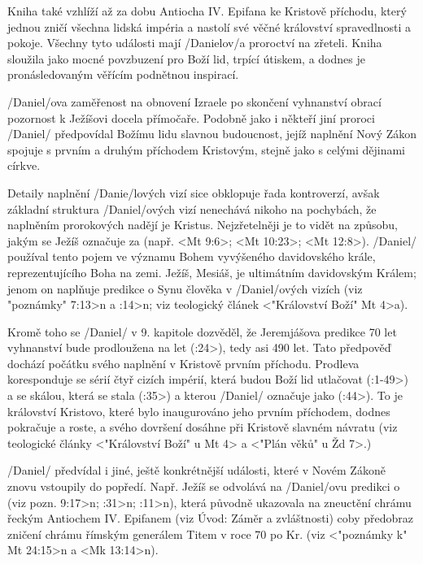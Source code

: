 Kniha také vzhlíží až za dobu Antiocha IV. Epifana ke Kristově příchodu, který jednou zničí všechna lidská impéria a nastolí své věčné království spravedlnosti a pokoje. Všechny tyto události mají \x/Danielov/a proroctví na zřeteli.
Kniha sloužila jako mocné povzbuzení pro Boží lid, trpící útiskem, a dodnes je pronásledovaným věřícím podnětnou inspirací. 


\x/Daniel/ova zaměřenost na obnovení Izraele po skončení vyhnanství obrací pozornost k Ježíšovi docela přímočaře.
Podobně jako i někteří jiní proroci \x/Daniel/ předpovídal Božímu lidu slavnou budoucnost, jejíž naplnění Nový Zákon 
spojuje s prvním a druhým příchodem Kristovým, stejně jako s celými dějinami církve.

Detaily naplnění \x/Danie/lových vizí sice obklopuje řada kontroverzí, avšak základní struktura \x/Daniel/ových vizí nenechává nikoho na pochybách, že naplněním prorokových nadějí je Kristus.
Nejzřetelněji je to vidět na způsobu, jakým se Ježíš označuje za  (např. <Mt 9:6>; <Mt 10:23>; <Mt 12:8>).
\x/Daniel/ používal tento pojem ve významu Bohem vyvýšeného davidovského krále, reprezentujícího Boha na zemi.
Ježíš, Mesiáš, je ultimátním davidovským Králem; jenom on naplňuje predikce o Synu člověka v \x/Daniel/ových vizích (viz \<"poznámky" 7:13>n a :14>n; viz teologický článek 
<"Království Boží"  Mt 4>a). 

Kromě toho se \x/Daniel/ v 9. kapitole dozvěděl, že Jeremjášova predikce 70 let vyhnanství bude prodloužena 
na  let (:24>), tedy asi 490 let.
Tato předpověď dochází počátku svého naplnění v Kristově prvním příchodu. Prodleva koresponduje se sérií čtyř cizích impérií, která budou Boží lid utlačovat (:1-49>) a se skálou, která se stala  (:35>) a kterou \x/Daniel/ označuje jako  (:44>). 
To je království Kristovo, které bylo inaugurováno jeho prvním příchodem, dodnes pokračuje a roste, a svého dovršení dosáhne při Kristově slavném návratu (viz teologické články <"Království Boží" u Mt 4> a <"Plán věků" u Žd 7>.)

\x/Daniel/ předvídal i jiné, ještě konkrétnější události, které v Novém Zákoně znovu vstoupily do popředí.
Např. Ježíš  se odvolává na \x/Daniel/ovu predikci o  (viz \<pozn. 9:17>n; :31>n; :11>n),
která původně ukazovala na zneuctění chrámu řeckým Antiochem IV. Epifanem (viz Úvod: Záměr a zvláštnosti) coby předobraz zničení chrámu  římským generálem Titem v roce 70 po Kr. (viz <"poznámky k" Mt 24:15>n a <Mk 13:14>n).

